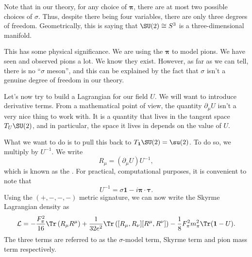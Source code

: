 \documentclass[a4paper]{article}
\begin{document}
%
%

Note that in our theory, for any choice of $\boldsymbol\pi$, there are at most two possible choices of $\sigma$. Thus, despite there being four variables, there are only three degrees of freedom. Geometrically, this is saying that $\SU(2) \cong S^3$ is a three-dimensional manifold.

This has some physical significance. We are using the $\boldsymbol\pi$ to model pions. We have seen and observed pions a lot. We know they exist. However, as far as we can tell, there is no ``$\sigma$ meson'', and this can be explained by the fact that $\sigma$ isn't a genuine degree of freedom in our theory.

Let's now try to build a Lagrangian for our field $U$. We will want to introduce derivative terms. From a mathematical point of view, the quantity $\partial_\mu U$ isn't a very nice thing to work with. It is a quantity that lives in the tangent space $T_U \SU(2)$, and in particular, the space it lives in depends on the value of $U$.

What we want to do is to pull this back to $T_\mathbf{1} \SU(2) = \su(2)$. To do so, we multiply by $U^{-1}$. We write
\[
  R_\mu = (\partial_\mu U)U^{-1},
\]
which is known as the . For practical, computational purposes, it is convenient to note that
\[
  U^{-1} = \sigma \mathbf{1} - i \boldsymbol\pi \cdot \boldsymbol\tau.
\]
Using the $(+, -, -, -)$ metric signature, we can now write the Skyrme Lagrangian density as
\[
  \mathcal{L} =-\frac{F_{\pi}^2 }{16} \Tr \left( R_\mu R^\mu\right) +\frac{1}{32e^2}\Tr\left([R_\mu, R_\nu][R^\mu, R^\nu]\right) - \frac{1}{8} F_\pi^2 m_\pi^2 \Tr(\mathbf{1} - U).
\]
The three terms are referred to as the $\sigma$-model term, Skyrme term and pion mass term respectively.
\end{document}
